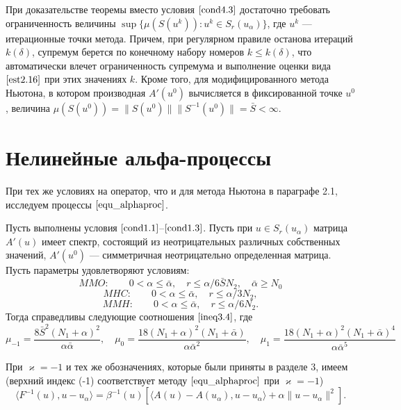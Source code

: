 \remark При доказательстве теоремы вместо условия  $\eqref{cond4.3}$ достаточно требовать ограниченность величины $\sup\{\mu(S(u^k)): u^k \in S_r(u_\alpha)\}$, где $u^k$ --- итерационные точки метода. Причем, при регулярном правиле останова итераций $k(\delta)$, супремум берется по конечному набору номеров $k\le k(\delta)$, что автоматически влечет ограниченность супремума и выполнение оценки вида $\eqref{est2.16}$ при этих значениях $k$. Кроме того, для модифицированного метода Ньютона, в котором производная $A'(u^0)$ вычисляется в фиксированной точке $u^0$, величина $\mu(S(u^0))=\|S(u^0)\|\|S^{-1}(u^0)\|=\bar S<\infty$.

\newpage
\section{Нелинейные альфа-процессы}
При тех же условиях на оператор, что и для метода Ньютона в параграфе 2.1, исследуем процессы $\eqref{equ_alphaproc}$.
\begin{theorem}\label{teo4.2}
	Пусть выполнены условия $\eqref{cond1.1}$--$\eqref{cond1.3}$. Пусть при $u \in S_r(u_\alpha)$ матрица $A'(u)$ имеет спектр, состоящий из неотрицательных различных собственных значений, $A'(u^0)$ --- симметричная неотрицательно определенная матрица. Пусть параметры удовлетворяют условиям: 
	\begin{equation}\label{cond4.4}
	MMO:\qquad 0<\alpha\le\bar\alpha, \quad r\le\alpha /6\bar SN_2, \quad \bar\alpha \ge N_0
	\end{equation}
	\begin{equation}\label{cond4.5}
	MHC:\qquad 0<\alpha\le\bar\alpha, \quad r\le\alpha /3N_2,
	\end{equation}
	\begin{equation}\label{cond4.6}
	MMH:\qquad 0<\alpha\le\bar\alpha, \quad r\le\alpha /6N_2.
	\end{equation}
	Тогда справедливы следующие соотношения  $\eqref{ineq3.4}$, где
	\begin{equation}\label{eq4.7}
	\mu _{-1}=\frac{8\bar S^2(N_1+\alpha)^2}{\alpha\bar\alpha}, \quad \mu _0=\frac{18(N_1+\alpha)^2(N_1+\bar\alpha)}{\alpha\bar\alpha ^2}, \quad \mu _1=\frac{18(N_1+\alpha)^2(N_1+\bar\alpha)^4}{\alpha\bar\alpha ^5}
	\end{equation}
\end{theorem}
\proof При $\varkappa=-1$ и тех же обозначениях, которые были приняты в разделе 3, имеем (верхний индекс (-1) соответствует методу $\eqref{equ_alphaproc}$ при $\varkappa=-1$)
$$\langle F^{-1}(u), u-u_\alpha\rangle=\beta ^{-1}(u)[\langle A(u)-A(u_\alpha), u-u_\alpha\rangle+\alpha\|u-u_\alpha\|^2].$$
